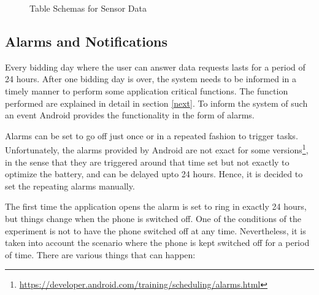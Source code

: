 \begin{figure}[htp]
\hspace{1em}
%
\caption{Table Schemas for Sensor Data}
\label{fig:ts22}
\end{figure}


\subsection{Alarms and Notifications}

Every bidding day where the user can answer data requests lasts for a period of 24 hours. After one bidding day is over, the system needs to be informed in a timely manner to perform some application critical functions. The function performed are explained in detail in section \ref{next}. 
To inform the system of such an event Android provides the functionality in the form of alarms. 

Alarms can be set to go off just once or in a repeated fashion to trigger tasks. Unfortunately, the alarms provided by Android are not exact for some versions\footnote{\url{https://developer.android.com/training/scheduling/alarms.html}}, in the sense that they are triggered around that time set but not exactly to optimize the battery, and can be delayed upto 24 hours. Hence, it is decided to set the repeating alarms manually. 

The first time the application opens the alarm is set to ring in exactly 24 hours, but things change when the phone is switched off.
One of the conditions of the experiment is not to have the phone switched off at any time. Nevertheless, it is taken into account the scenario where
the phone is kept switched off for a period of time. There are various things that can happen:

